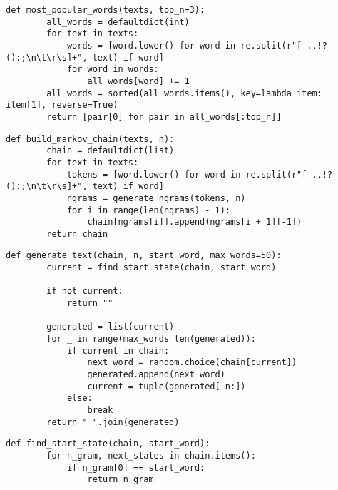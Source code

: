 \begin{lstlisting}[caption={Поиск самых популярных слов}]
    def most_popular_words(texts, top_n=3):
        all_words = defaultdict(int)
        for text in texts:
            words = [word.lower() for word in re.split(r"[-.,!?():;\n\t\r\s]+", text) if word]
            for word in words:
                all_words[word] += 1
        all_words = sorted(all_words.items(), key=lambda item: item[1], reverse=True)
        return [pair[0] for pair in all_words[:top_n]]
\end{lstlisting}

\begin{lstlisting}[caption={Создание цепи Маркова}]
    def build_markov_chain(texts, n):
        chain = defaultdict(list)
        for text in texts:
            tokens = [word.lower() for word in re.split(r"[-.,!?():;\n\t\r\s]+", text) if word]
            ngrams = generate_ngrams(tokens, n)
            for i in range(len(ngrams) - 1):
                chain[ngrams[i]].append(ngrams[i + 1][-1])
        return chain
\end{lstlisting}

\begin{lstlisting}[caption={Генерация текста}]
    def generate_text(chain, n, start_word, max_words=50):
        current = find_start_state(chain, start_word)

        if not current:
            return ""

        generated = list(current)
        for _ in range(max_words len(generated)):
            if current in chain:
                next_word = random.choice(chain[current])
                generated.append(next_word)
                current = tuple(generated[-n:])
            else:
                break
        return " ".join(generated)
\end{lstlisting}

\begin{lstlisting}[caption={Поиск начальной н-граммы}]
    def find_start_state(chain, start_word):
        for n_gram, next_states in chain.items():
            if n_gram[0] == start_word:
                return n_gram
\end{lstlisting}

